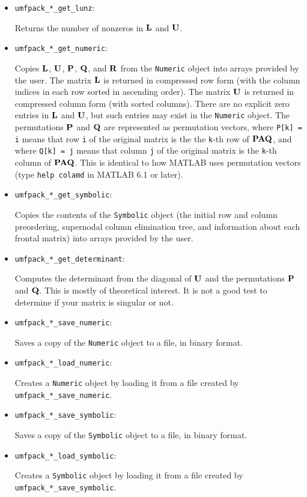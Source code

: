 \documentclass[11pt]{article}
\newcommand{\m}[1]{{\bf{#1}}}       %
\begin{document}
\begin{itemize}
\item {\tt umfpack\_*\_get\_lunz}:

    Returns the number of nonzeros in $\m{L}$ and $\m{U}$.

\item {\tt umfpack\_*\_get\_numeric}:

    Copies $\m{L}$, $\m{U}$, $\m{P}$, $\m{Q}$, and $\m{R}$
    from the {\tt Numeric} object
    into arrays provided by the user.  The matrix $\m{L}$ is returned in
    compressed row form (with the column indices in each row sorted in ascending
    order).  The matrix $\m{U}$ is returned in compressed column form (with
    sorted columns).  There are no explicit zero entries in $\m{L}$ and $\m{U}$,
    but such entries may exist in the {\tt Numeric} object.  The permutations
    $\m{P}$ and $\m{Q}$ are represented as permutation vectors, where
    {\tt P[k] = i} means that row {\tt i} of the original matrix is the
    the {\tt k}-th row of $\m{PAQ}$, and where
    {\tt Q[k] = j} means that column {\tt j} of the original matrix is the
    {\tt k}-th column of $\m{PAQ}$.  This is identical to how MATLAB uses
    permutation vectors (type {\tt help colamd} in MATLAB 6.1 or later).

\item {\tt umfpack\_*\_get\_symbolic}:

    Copies the contents of the {\tt Symbolic} object (the initial row and column
    preordering, supernodal column elimination tree, and information
    about each frontal matrix) into arrays provided by the user.

\item {\tt umfpack\_*\_get\_determinant}:

    Computes the determinant from the diagonal of $\m{U}$ and the permutations
    $\m{P}$ and $\m{Q}$.  This is mostly of theoretical interest.
    It is not a good test to determine if your matrix is singular or not.

\item {\tt umfpack\_*\_save\_numeric}:

    Saves a copy of the {\tt Numeric} object to a file, in binary format.

\item {\tt umfpack\_*\_load\_numeric}:

    Creates a {\tt Numeric} object by loading it from a file created
    by {\tt umfpack\_*\_save\_numeric}.

\item {\tt umfpack\_*\_save\_symbolic}:

    Saves a copy of the {\tt Symbolic} object to a file, in binary format.

\item {\tt umfpack\_*\_load\_symbolic}:

    Creates a {\tt Symbolic} object by loading it from a file created
    by {\tt umfpack\_*\_save\_symbolic}.

\end{itemize}
\end{document}
